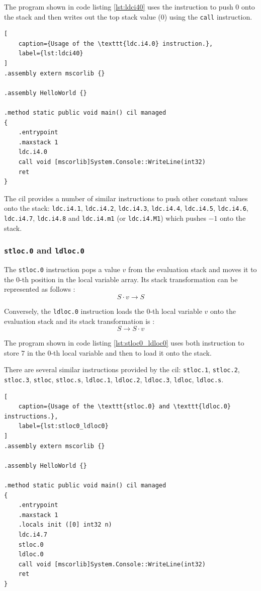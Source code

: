 \documentclass{article}
\numberwithin{equation}{section}
\begin{document}
The program shown in code listing \ref{lst:ldci40} uses the instruction to push $0$ onto the stack and then writes out the top stack value ($0$) using the \texttt{call} instruction.

\begin{lstlisting}[
	caption={Usage of the \texttt{ldc.i4.0} instruction.},
	label={lst:ldci40}
]
.assembly extern mscorlib {}

.assembly HelloWorld {}

.method static public void main() cil managed
{
	.entrypoint
	.maxstack 1
	ldc.i4.0
	call void [mscorlib]System.Console::WriteLine(int32)
	ret
}
\end{lstlisting}

The \acrshort{cil} provides a number of similar instructions to push other constant values onto the stack: \texttt{ldc.i4.1}, \texttt{ldc.i4.2}, \texttt{ldc.i4.3}, \texttt{ldc.i4.4}, \texttt{ldc.i4.5}, \texttt{ldc.i4.6}, \texttt{ldc.i4.7}, \texttt{ldc.i4.8} and \texttt{ldc.i4.m1} (or \texttt{ldc.i4.M1}) which pushes $-1$ onto the stack.

\subsubsection{\texttt{stloc.0} and \texttt{ldloc.0}}
\label{sec:desc_stloc0_ldloc0}

The \texttt{stloc.0} instruction pops a value $v$ from the evaluation stack and moves it to the $0$-th position in the local variable array. Its stack transformation can be represented as follows \cite{ecmaStandard}:
$$
	S \cdot v \rightarrow S
$$

Conversely, the \texttt{ldloc.0} instruction loads the $0$-th local variable $v$ onto the evaluation stack and its stack transformation is \cite{ecmaStandard}:
$$
	S \rightarrow S \cdot v
$$

The program shown in code listing \ref{lst:stloc0_ldloc0} uses both instruction to store $7$ in the $0$-th local variable and then to load it onto the stack.

There are several similar instructions provided by the \acrshort{cil}: \texttt{stloc.1}, \texttt{stloc.2}, \texttt{stloc.3}, \texttt{stloc}, \texttt{stloc.s}, \texttt{ldloc.1}, \texttt{ldloc.2}, \texttt{ldloc.3}, \texttt{ldloc}, \texttt{ldloc.s}.

\begin{lstlisting}[
	caption={Usage of the \texttt{stloc.0} and \texttt{ldloc.0} instructions.},
	label={lst:stloc0_ldloc0}
]
.assembly extern mscorlib {}

.assembly HelloWorld {}

.method static public void main() cil managed
{
	.entrypoint
	.maxstack 1
	.locals init ([0] int32 n)
	ldc.i4.7
	stloc.0
	ldloc.0
	call void [mscorlib]System.Console::WriteLine(int32)
	ret
}
\end{lstlisting}
\end{document}
